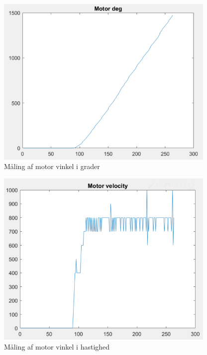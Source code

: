 \begin{figure}[H]
	\centering
	\includegraphics[width = 300pt]{Img/Motor_deg_graf.png}
	\caption{Måling af motor vinkel i grader}
	\label{fig:Motor_deg_graf}
\end{figure}

\begin{figure}[H]
	\centering
	\includegraphics[width = 300pt]{Img/Motor_velocity_graf.png}
	\caption{Måling af motor vinkel i hastighed}
	\label{fig:Motor_velocity_graf}
\end{figure}





\newpage